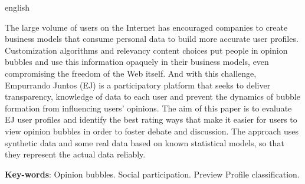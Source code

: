 \begin{resumo}[Abstract]
 \begin{otherlanguage*}{english}

The large volume of users on the Internet has encouraged companies to create business models that consume personal data to build more accurate user profiles. Customization algorithms and relevancy content choices put people in opinion bubbles and use this information opaquely in their business models, even compromising the freedom of the Web itself. And with this challenge, Empurrando Juntos (EJ) is a participatory platform that seeks to deliver transparency, knowledge of data to each user and prevent the dynamics of bubble formation from influencing users' opinions. The aim of this paper is to evaluate EJ user profiles and identify the best rating ways that make it easier for users to view opinion bubbles in order to foster debate and discussion. The approach uses synthetic data and some real data based on known statistical models, so that they represent the actual data reliably.


   \vspace{\onelineskip}
 
   \noindent 
   \textbf{Key-words}: Opinion bubbles. Social participation. Preview Profile classification.
 \end{otherlanguage*}
\end{resumo}
